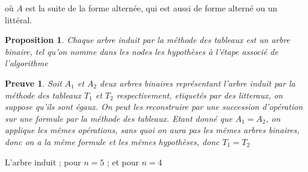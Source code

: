 \documentclass{paper}
\newtheorem{prop}{Proposition}
\newtheorem{preuve}{Preuve}
\begin{document}

où $A$ est la suite de la forme alternée, qui est aussi de forme alterné ou un littéral.

\begin{prop}
   Chaque arbre induit par la méthode des tableaux est un arbre binaire, tel qu'on nomme dans les nodes les hypothèses à l'étape associé de l'algorithme
\end{prop}

\begin{preuve}
    Soit $A_1$ et $A_2$ deux arbres binaires représentant l'arbre induit par la méthode des tableaux $T_1$ et $T_2$ respectivement, etiquetés par des litteraux, on suppose qu'ils sont égaux. On peut les reconstruire par une succession d'opération sur une formule par la méthode des tableaux.
    Etant donné que $A_1=A_2$, on applique les mêmes opérations, sans quoi on aura pas les mêmes arbres binaires, donc on a la même formule et les mêmes hypothèses, donc $T_1=T_2$
\end{preuve}

L'arbre induit ; pour $n=5$ ; et pour $n=4$

\end{document}
